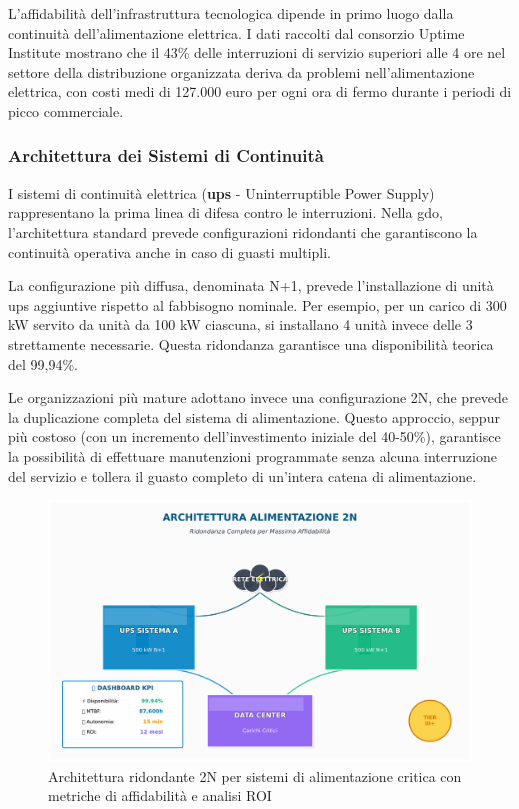 L'affidabilità dell'infrastruttura tecnologica dipende in primo luogo dalla continuità dell'alimentazione elettrica. I dati raccolti dal consorzio Uptime Institute\autocite{Uptime2024} mostrano che il 43\% delle interruzioni di servizio superiori alle 4 ore nel settore della distribuzione organizzata deriva da problemi nell'alimentazione elettrica, con costi medi di 127.000 euro per ogni ora di fermo durante i periodi di picco commerciale.

\subsubsection{\texorpdfstring{Architettura dei Sistemi di Continuità}{3.3.1.1 - Architettura dei Sistemi di Continuità}}

I sistemi di continuità elettrica (\textbf{\gls{ups}} - Uninterruptible Power Supply) rappresentano la prima linea di difesa contro le interruzioni. Nella \gls{gdo}, l'architettura standard prevede configurazioni ridondanti che garantiscono la continuità operativa anche in caso di guasti multipli\autocite{IEEE2024}.

La configurazione più diffusa, denominata N+1, prevede l'installazione di unità \gls{ups} aggiuntive rispetto al fabbisogno nominale. Per esempio, per un carico di 300 kW servito da unità da 100 kW ciascuna, si installano 4 unità invece delle 3 strettamente necessarie. Questa ridondanza garantisce una disponibilità teorica del 99,94\%.

Le organizzazioni più mature adottano invece una configurazione 2N, che prevede la duplicazione completa del sistema di alimentazione. Questo approccio, seppur più costoso (con un incremento dell'investimento iniziale del 40-50\%), garantisce la possibilità di effettuare manutenzioni programmate senza alcuna interruzione del servizio e tollera il guasto completo di un'intera catena di alimentazione.

\begin{figure}[htbp]
\centering
\includegraphics[width=\textwidth]{thesis_figures/cap3/fig1_power_modern.pdf}
\caption{Architettura ridondante 2N per sistemi di alimentazione critica con metriche di affidabilità e analisi ROI}
\label{fig:power_architecture}
\end{figure}

